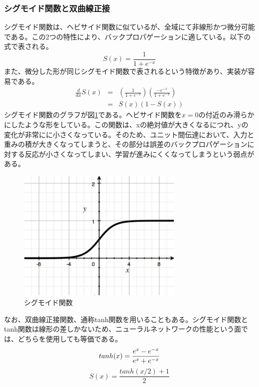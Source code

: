 \subsubsection{シグモイド関数と双曲線正接}
シグモイド関数は、ヘビサイド関数に似ているが、全域にて非線形かつ微分可能である。この2つの特性により、バックプロパゲーションに適している。以下の式で表される。
\begin{equation}
S(x) = \frac{1}{1+e^{-x}}
\end{equation}
また、微分した形が同じシグモイド関数で表されるという特徴があり、実装が容易である。
\begin{eqnarray}
\frac{d}{dx}S(x) &=& \left( \frac{1}{1+e^{-x}} \right) \left( \frac{-e^{-x}}{1+e^{-x}} \right)\\
&=& S(x)(1-S(x))
\end{eqnarray}
シグモイド関数のグラフが図\ref{c3_sigmoid}である。ヘビサイド関数を$x=0$の付近のみ滑らかにしたような形をしている。この関数は、xの絶対値が大きくなるにつれ、yの変化が非常にに小さくなっている。そのため、ユニット間伝達において、入力と重みの積が大きくなってしまうと、その部分は誤差のバックプロパゲーションに対する反応が小さくなってしまい、学習が進みにくくなってしまうという弱点がある。
\begin{figure}[tbp]
 \centering
  \includegraphics[width=80mm]{img/c3/sigmoid}
 \caption{シグモイド関数}
 \label{c3_sigmoid}
\end{figure}
なお、双曲線正接関数、通称tanh関数を用いることもある。シグモイド関数とtanh関数は線形の差しかないため、ニューラルネットワークの性能という面では、どちらを使用しても等価である。
\begin{equation}
tanh(x) = \frac{e^x-e^{-x}}{e^x+e^{-x}} \\\\
\end{equation}
\begin{equation}
S(x) = \frac{tanh(x/2)+1}{2}
\end{equation}

